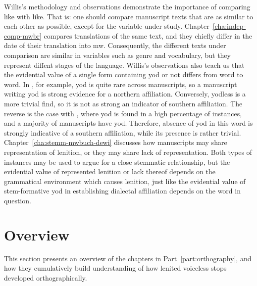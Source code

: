 Willis's methodology and observations demonstrate the importance of comparing like with like. That is: one should compare manuscript texts that are as similar to each other as possible, except for the variable under study. Chapter~\ref{cha:indep-comp-mwbr} compares translations of the same text, and they chiefly differ in the date of their translation into \gls{mw}. Consequently, the different texts under comparison are similar in variables such as genre and vocabulary, but they represent diffent stages of the language. Willis's observations also teach us that the evidential value of a single form containing yod or not differs from word to word. In , for example, yod is quite rare across manuscripts, so a manuscript writing yod is strong evidence for a northern affiliation. Conversely, yodless  is a more trivial find, so it is not as strong an indicator of southern affiliation. The reverse is the case with , where yod is found in a high percentage of instances, and a majority of manuscripts have yod. Therefore, absence of yod in this word is strongly indicative of a southern affiliation, while its presence is rather trivial. Chapter~\ref{cha:stemm-mwbuch-dewi} discusses how manuscripts may share representation of lenition, or they may share lack of representation. Both types of  instances may be used to argue for a close stemmatic relationship, but the evidential value of represented lenition or lack thereof depends on the grammatical environment which causes lenition, just like the evidential value of stem-formative yod in establishing dialectal affiliation depends on the word in question.


\section{Overview}
\label{sec:overview}

This section presents an overview of the chapters in Part~\ref{part:orthography}, and how they  cumulatively build understanding of how lenited voiceless stops developed orthographically.

